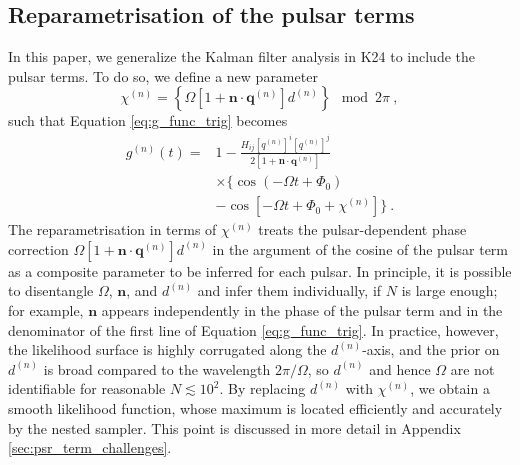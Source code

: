 \documentclass[fleqn,usenatbib,useAMS]{mnras}
\begin{document}
\subsection{Reparametrisation of the pulsar terms} \label{sec:pulsar_term2}
In this paper, we generalize the Kalman filter analysis in K24 to include the pulsar terms. To do so, we define a new parameter 
\begin{equation}
	\chi^{(n)} = \left\{ \Omega \left[ 1 + \boldsymbol{n}\cdot \boldsymbol{q}^{(n)} \right]  d^{(n)} \right \} \mod 2 \pi \ , \label{eq:chi_param}
\end{equation}
such that Equation \eqref{eq:g_func_trig} becomes
\begin{align}
	g^{(n)}(t) =& 1 - \frac{ H_{ij}[q^{(n)}]^i [q^{(n)}]^j }{2 [1 + \boldsymbol{n}\cdot \boldsymbol{q}^{(n)}] } \nonumber \\
	& \times \Big \{\cos\left(-\Omega t +\Phi_0\right) \nonumber \\
	&- \cos \left [-\Omega t +\Phi_0 + \chi^{(n)} \right ] \Big \} \ .
	\label{eq:g_func_trig_chi}
\end{align}
The reparametrisation in terms of $\chi^{(n)}$ treats the pulsar-dependent phase correction $\Omega \left[ 1 + \boldsymbol{n}\cdot \boldsymbol{q}^{(n)} \right]  d^{(n)}$ in the argument of the cosine of the pulsar term as a composite parameter to be inferred for each pulsar. In principle, it is possible to disentangle $\Omega$, $\boldsymbol{n}$, and $d^{(n)}$ and infer them individually, if $N$ is large enough; for example, $\boldsymbol{n}$ appears independently in the phase of the pulsar term and in the denominator of the first line of Equation \eqref{eq:g_func_trig}. In practice, however, the likelihood surface is highly corrugated along the $d^{(n)}$-axis, and the prior on $d^{(n)}$ is broad compared to the wavelength $2\pi/\Omega$, so $d^{(n)}$ and hence $\Omega$ are not identifiable for reasonable $N \lesssim 10^2$. By replacing $d^{(n)}$ with $\chi^{(n)}$, we obtain a smooth likelihood function, whose maximum is located efficiently and accurately by the nested sampler. This point is discussed in more detail in Appendix \ref{sec:psr_term_challenges}.\newline 
 
\end{document}
